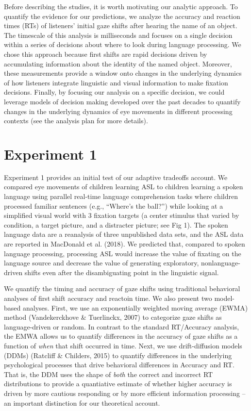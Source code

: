 \documentclass[english,floatsintext,man]{apa6}
\theoremstyle{definition}
\theoremstyle{definition}
\theoremstyle{definition}
\theoremstyle{remark}
\begin{document}
Before describing the studies, it is worth motivating our analytic
approach. To quantify the evidence for our predictions, we analyze the
accuracy and reaction times (RTs) of listeners' initial gaze shifts
after hearing the name of an object. The timescale of this analysis is
milliseconds and focuses on a single decision within a series of
decisions about where to look during language processing. We chose this
approach because first shifts are rapid decisions driven by accumulating
information about the identity of the named object. Moreover, these
measurements provide a window onto changes in the underlying dynamics of
how listeners integrate linguistic and visual information to make
fixation decisions. Finally, by focusing our analysis on a specific
decision, we could leverage models of decision making developed over the
past decades to quantify changes in the underlying dynamics of eye
movements in different processing contexts (see the analysis plan for
more details).

\hypertarget{experiment-1}{%
\section{Experiment 1}\label{experiment-1}}

Experiment 1 provides an initial test of our adaptive tradeoffs account.
We compared eye movements of children learning ASL to children learning
a spoken language using parallel real-time language comprehension tasks
where children processed familiar sentences (e.g., \enquote{Where's the
ball?}) while looking at a simplified visual world with 3 fixation
targets (a center stimulus that varied by condition, a target picture,
and a distracter picture; see Fig 1). The spoken language data are a
reanalysis of three unpublished data sets, and the ASL data are reported
in MacDonald et al. (2018). We predicted that, compared to spoken
language processing, processing ASL would increase the value of fixating
on the language source and decrease the value of generating exploratory,
nonlanguage-driven shifts even after the disambiguating point in the
linguistic signal.

We quantify the timing and accuracy of gaze shifts using traditional
behavioral analyses of first shift accuracy and reactoin time. We also
present two model-based analyses. First, we use an exponentially
weighted moving average (EWMA) method (Vandekerckhove \& Tuerlinckx,
2007) to categorize gaze shifts as language-driven or random. In
contrast to the standard RT/Accuracy analysis, the EMWA allows us to
quantify differences in the accuracy of gaze shifts as a function of
\emph{when} that shift occurred in time. Next, we use drift-diffusion
models (DDMs) (Ratcliff \& Childers, 2015) to quantify differences in
the underlying psychological processes that drive behavioral differences
in Accuracy and RT. That is, the DDM uses the shape of \emph{both} the
correct and incorrect RT distributions to provide a quantiative estimate
of whether higher accuracy is driven by more cautious responding or by
more efficient information processing -- an important distinction for
our theoretical account.
\end{document}
